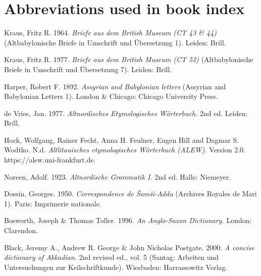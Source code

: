 \sloppy 
{}



\ohead{\lsNameIndexTitle}
\printindex 
\cleardoublepage


{}
\printindex[ban]
\ohead{}

\section*{Abbreviations used in book index}

\begin{description}

  \setlength{\itemsep}{0em}
\item[\bfseries\upshape AbB 1]Kraus, Fritz R. 1964. \emph{Briefe aus dem British Museum (CT 43 \& 44)} (Altbabylonische Briefe in Umschrift und Übersetzung 1). Leiden: Brill.
\item[\bfseries\upshape AbB 7]Kraus, Fritz R. 1977. \emph{Briefe aus dem British Museum (CT 52)} (Altbabylonische Briefe in Umschrift und Übersetzung 7). Leiden: Brill.
\item[\bfseries\upshape ABL 1]Harper, Robert F. 1892. \emph{Assyrian and Babylonian letters} (Assyrian and Babylonian Letters 1). London \& Chicago: Chicago University Press.
\item[\bfseries\upshape AEW]de Vries, Jan. 1977. \emph{Altnordisches Etymologisches Wörterbuch.} 2nd ed. Leiden: Brill.
\item[\bfseries\upshape ALEW ]Hock, Wolfgang, Rainer Fecht, Anna H. Feulner, Eugen Hill and Dagmar S. Wodtko. N.d. \emph{Altlitauisches etymologisches Wörterbuch (ALEW).} Version 2.0.  https://alew.uni-frankfurt.de.
\item[\bfseries\upshape AnGr]Noreen, Adolf. 1923. \emph{Altnordische Grammatik I.} 2nd ed. Halle: Niemeyer.
\item[\bfseries\upshape ARM 1]Dossin, Georges. 1950. \emph{Correspondence de Šamši-Addu} (Archives Royales de Mari 1). Paris: Imprimerie nationale.
\item[\bfseries\upshape BT]Bosworth, Joseph \& Thomas Toller. 1996. \emph{An Anglo-Saxon Dictionary.} London: Clarendon.
\item[\bfseries\upshape CDA]Black, Jeremy A., Andrew R. George \& John Nicholas Postgate. 2000. \emph{A concise dictionary of Akkadian.} 2nd revised ed., vol. 5 (Santag: Arbeiten und Untersuchungen zur Keilschriftkunde). Wiesbaden: Harrassowitz Verlag.

\end{description}

